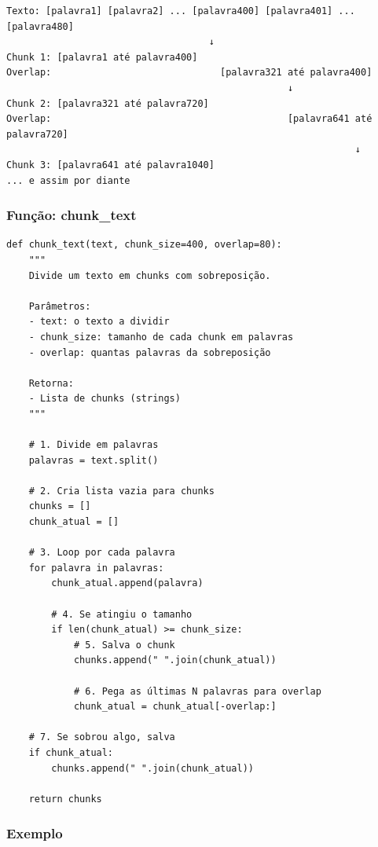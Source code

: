 \documentclass[12pt,a4paper]{article}
\begin{document}
\begin{verbatim}
Texto: [palavra1] [palavra2] ... [palavra400] [palavra401] ... [palavra480]
                                    ↓
Chunk 1: [palavra1 até palavra400]
Overlap:                              [palavra321 até palavra400]
                                                  ↓
Chunk 2: [palavra321 até palavra720]
Overlap:                                          [palavra641 até palavra720]
                                                              ↓
Chunk 3: [palavra641 até palavra1040]
... e assim por diante
\end{verbatim}

\subsubsection{Função: chunk\_text}

\begin{lstlisting}
def chunk_text(text, chunk_size=400, overlap=80):
    """
    Divide um texto em chunks com sobreposição.
    
    Parâmetros:
    - text: o texto a dividir
    - chunk_size: tamanho de cada chunk em palavras
    - overlap: quantas palavras da sobreposição
    
    Retorna:
    - Lista de chunks (strings)
    """
    
    # 1. Divide em palavras
    palavras = text.split()
    
    # 2. Cria lista vazia para chunks
    chunks = []
    chunk_atual = []
    
    # 3. Loop por cada palavra
    for palavra in palavras:
        chunk_atual.append(palavra)
        
        # 4. Se atingiu o tamanho
        if len(chunk_atual) >= chunk_size:
            # 5. Salva o chunk
            chunks.append(" ".join(chunk_atual))
            
            # 6. Pega as últimas N palavras para overlap
            chunk_atual = chunk_atual[-overlap:]
    
    # 7. Se sobrou algo, salva
    if chunk_atual:
        chunks.append(" ".join(chunk_atual))
    
    return chunks
\end{lstlisting}

\subsubsection{Exemplo}
\end{document}
